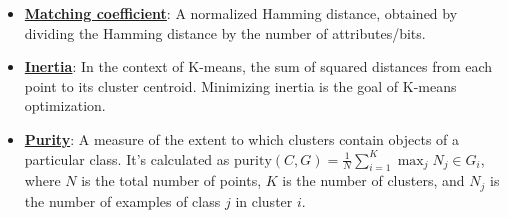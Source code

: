 \documentclass{article}%
\begin{document}
\begin{itemize}[leftmargin=*]
\item \href{https://purdue.brightspace.com/d2l/common/assets/pdfjs-d2l-dist/1.0.14-legacy/web/viewer.html?file=\%2Fcontent\%2Fenforced\%2F1095467-wl.202510.CS.24300.001\%2F12L2-distance-clusters.pdf\%3Fou\%3D1095467\&lang=en-us\&container=d2l-fileviewer-rendered-pdf\&fullscreen=d2l-fileviewer-rendered-pdf-dialog\&height=667#page=19}{\textbf{Matching coefficient}}: A normalized Hamming distance, obtained by dividing the Hamming distance by the number of attributes/bits.%
\item \href{https://purdue.brightspace.com/d2l/common/assets/pdfjs-d2l-dist/1.0.14-legacy/web/viewer.html?file=\%2Fcontent\%2Fenforced\%2F1095467-wl.202510.CS.24300.001\%2F12L2-distance-clusters.pdf\%3Fou\%3D1095467\&lang=en-us\&container=d2l-fileviewer-rendered-pdf\&fullscreen=d2l-fileviewer-rendered-pdf-dialog\&height=667#page=33}{\textbf{Inertia}}: In the context of K-means, the sum of squared distances from each point to its cluster centroid. Minimizing inertia is the goal of K-means optimization.%
\item \href{https://purdue.brightspace.com/d2l/common/assets/pdfjs-d2l-dist/1.0.14-legacy/web/viewer.html?file=\%2Fcontent\%2Fenforced\%2F1095467-wl.202510.CS.24300.001\%2F12L2-distance-clusters.pdf\%3Fou\%3D1095467\&lang=en-us\&container=d2l-fileviewer-rendered-pdf\&fullscreen=d2l-fileviewer-rendered-pdf-dialog\&height=667#page=44}{\textbf{Purity}}: A measure of the extent to which clusters contain objects of a particular class. It's calculated as $\text{purity}(C, G) = \frac{1}{N} \sum_{i=1}^K \max_j N_j \in G_i$, where $N$ is the total number of points, $K$ is the number of clusters, and $N_j$ is the number of examples of class $j$ in cluster $i$.%
\end{itemize}

%
\end{document}
